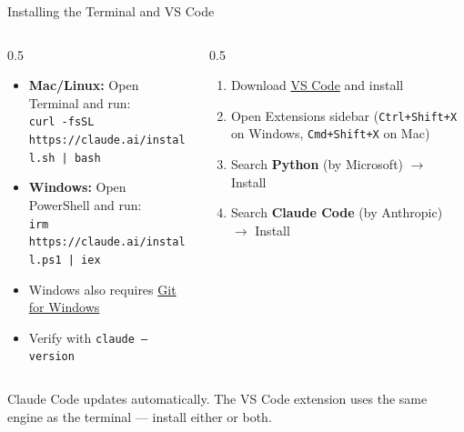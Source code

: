 \documentclass[aspectratio=169]{beamer}
\begin{document}
\begin{frame}{Installing the Terminal and VS Code}
\begin{columns}[T]
\begin{column}{0.5\textwidth}
\begin{shadedbox}[title=\textbf{Claude Code (Terminal)}]
\begin{itemize}\small
  \item \textbf{Mac/Linux:} Open Terminal and run:\\[2pt]
    \texttt{\footnotesize curl -fsSL https://claude.ai/install.sh | bash}
  \item \textbf{Windows:} Open PowerShell and run:\\[2pt]
    \texttt{\footnotesize irm https://claude.ai/install.ps1 | iex}
  \item Windows also requires \href{https://git-scm.com/downloads/win}{Git for Windows}
  \item Verify with \texttt{claude --version}
\end{itemize}
\end{shadedbox}
\end{column}
\begin{column}{0.5\textwidth}
\begin{shadedbox}[title=\textbf{VS Code + Extensions}]
\begin{enumerate}\small
  \item Download \href{https://code.visualstudio.com}{VS Code} and install
  \item Open Extensions sidebar (\texttt{Ctrl+Shift+X} on Windows, \texttt{Cmd+Shift+X} on Mac)
  \item Search \textbf{Python} (by Microsoft) $\rightarrow$ Install
  \item Search \textbf{Claude Code} (by Anthropic) $\rightarrow$ Install
\end{enumerate}
\end{shadedbox}
\end{column}
\end{columns}
\vspace{0.3cm}
Claude Code updates automatically.  The VS Code extension uses the same engine as the terminal --- install either or both.
\end{frame}
\end{document}
